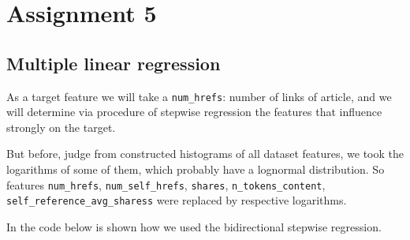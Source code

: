 \section{Assignment 5}
\subsection{Multiple linear regression}

As a target feature we will take a \texttt{num\_hrefs}: number of links of article, and we will determine via procedure of stepwise regression the features that influence strongly on the target. 

But before, judge from constructed histograms of all dataset features, we took the logarithms of some of them, which probably have a lognormal distribution. So features \texttt{num\_hrefs}, \texttt{num\_self\_hrefs}, \texttt{shares}, \texttt{n\_tokens\_content}, \texttt{self\_reference\_avg\_sharess} were replaced by respective logarithms. 

In the code below is shown how we used the bidirectional stepwise regression.

